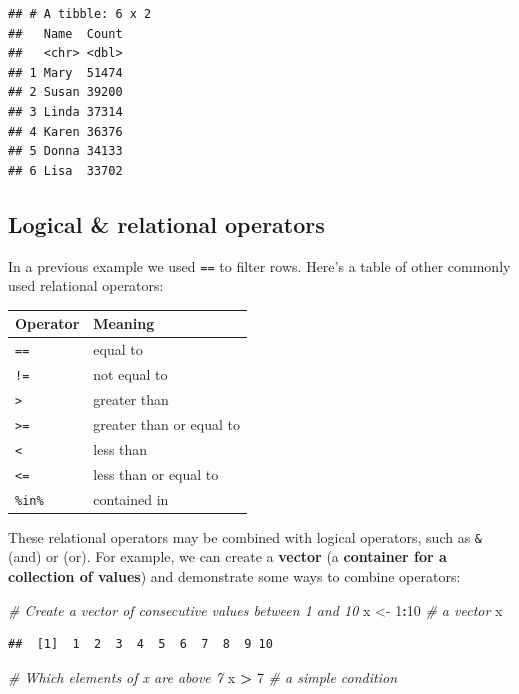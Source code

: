 \documentclass[
]{book}
\newenvironment{Shaded}{\begin{snugshade}}{\end{snugshade}}
\newcommand{\CommentTok}[1]{\textcolor[rgb]{0.56,0.35,0.01}{\textit{#1}}}
\newcommand{\DecValTok}[1]{\textcolor[rgb]{0.00,0.00,0.81}{#1}}
\newcommand{\NormalTok}[1]{#1}
\newcommand{\OperatorTok}[1]{\textcolor[rgb]{0.81,0.36,0.00}{\textbf{#1}}}
\newcommand{\StringTok}[1]{\textcolor[rgb]{0.31,0.60,0.02}{#1}}
\begin{document}
\begin{verbatim}
## # A tibble: 6 x 2
##   Name  Count
##   <chr> <dbl>
## 1 Mary  51474
## 2 Susan 39200
## 3 Linda 37314
## 4 Karen 36376
## 5 Donna 34133
## 6 Lisa  33702
\end{verbatim}

\hypertarget{logical-relational-operators}{%
\subsection{Logical \& relational operators}\label{logical-relational-operators}}

In a previous example we used \texttt{==} to filter rows. Here's a table of other commonly used relational operators:

\begin{longtable}[]{@{}ll@{}}
\toprule
Operator & Meaning\tabularnewline
\midrule
\endhead
\texttt{==} & equal to\tabularnewline
\texttt{!=} & not equal to\tabularnewline
\texttt{\textgreater{}} & greater than\tabularnewline
\texttt{\textgreater{}=} & greater than or equal to\tabularnewline
\texttt{\textless{}} & less than\tabularnewline
\texttt{\textless{}=} & less than or equal to\tabularnewline
\texttt{\%in\%} & contained in\tabularnewline
\bottomrule
\end{longtable}

These relational operators may be combined with logical operators, such as \texttt{\&} (and) or \texttt{\textbar{}} (or). For example, we can create a \textbf{vector} (a \textbf{container for a collection of values}) and demonstrate some ways to combine operators:

\begin{Shaded}
\begin{Highlighting}[]
\CommentTok{\# Create a vector of consecutive values between 1 and 10}
\NormalTok{x \textless{}{-}}\StringTok{ }\DecValTok{1}\OperatorTok{:}\DecValTok{10} \CommentTok{\# a vector}
\NormalTok{x}
\end{Highlighting}
\end{Shaded}

\begin{verbatim}
##  [1]  1  2  3  4  5  6  7  8  9 10
\end{verbatim}

\begin{Shaded}
\begin{Highlighting}[]
\CommentTok{\# Which elements of x are above 7}
\NormalTok{x }\OperatorTok{\textgreater{}}\StringTok{ }\DecValTok{7} \CommentTok{\# a simple condition}
\end{Highlighting}
\end{Shaded}
\end{document}
